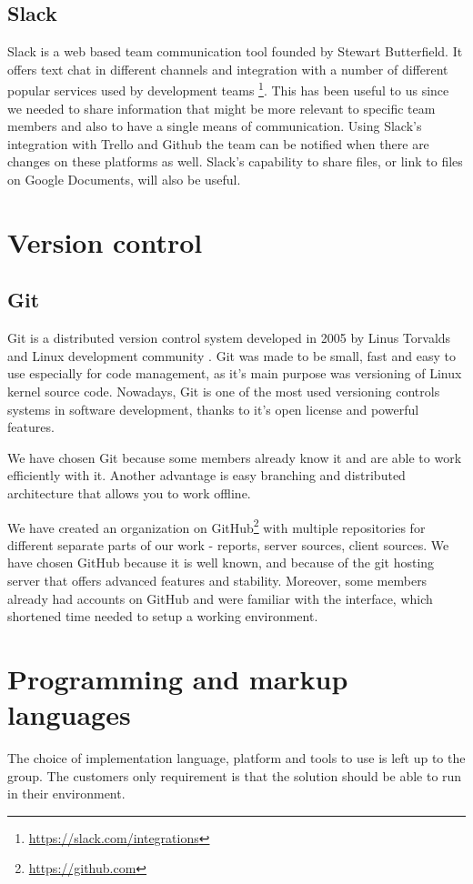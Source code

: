 \documentclass[11pt,a4paper,titlepage,oneside]{report}
\begin{document}
  \subsection{Slack}
  \label{subsec:Slack}
Slack is a web based team communication tool founded by Stewart Butterfield. It offers text chat in different channels and integration with a number of different popular services used by development teams \footnote{\url{https://slack.com/integrations}}. This has been useful to us since we needed to share information that might be more relevant to specific team members and also to have a single means of communication. Using Slack's integration with Trello and Github the team can be notified when there are changes on these platforms as well. Slack's capability to share files, or link to files on Google Documents, will also be useful. 

\section{Version control}
  \subsection{Git}
  Git is a distributed version control system developed in 2005 by Linus Torvalds and Linux development community \cite{ProGit}. Git was made to be small, fast and easy to use especially for code management, as it's main purpose was versioning of Linux kernel source code. Nowadays, Git is one of the most used versioning controls systems in software development, thanks to it's open license and powerful features.

  We have chosen Git because some members already know it and are able to work efficiently with it. Another advantage is easy branching and distributed architecture that allows you to work offline. 
  
  We have created an organization on GitHub\footnote{\url{https://github.com}} with multiple repositories for different separate parts of our work - reports, server sources, client sources. We have chosen GitHub because it is well known, and because of the git hosting server that offers advanced features and stability. Moreover, some members already had accounts on GitHub and were familiar with the interface, which shortened time needed to setup a working environment.

\section{Programming and markup languages}
The choice of implementation language, platform and tools to use is left up to the group. The customers only requirement is that the solution should be able to run in their environment.
\end{document}
